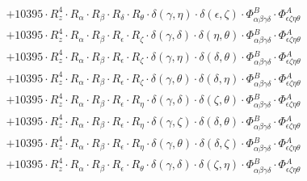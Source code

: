 \documentclass{article}
\begin{document}
\begin{equation}
\begin{array}{c}
 \\[0.2em] 		 + 10395 \cdot R_{z}^{4} \cdot R_{\alpha{}} \cdot R_{\beta{}} \cdot R_{\delta{}} \cdot R_{\theta{}} \cdot \delta{}\left(\gamma{}, \eta{}\right) \cdot \delta{}\left(\epsilon{}, \zeta{}\right) \cdot \Phi{}^{B}_{\alpha{}\beta{}\gamma{}\delta{}} \cdot \Phi{}^{A}_{\epsilon{}\zeta{}\eta{}\theta{}} 
 \\[0.2em] 		 + 10395 \cdot R_{z}^{4} \cdot R_{\alpha{}} \cdot R_{\beta{}} \cdot R_{\epsilon{}} \cdot R_{\zeta{}} \cdot \delta{}\left(\gamma{}, \delta{}\right) \cdot \delta{}\left(\eta{}, \theta{}\right) \cdot \Phi{}^{B}_{\alpha{}\beta{}\gamma{}\delta{}} \cdot \Phi{}^{A}_{\epsilon{}\zeta{}\eta{}\theta{}} 
 \\[0.2em] 		 + 10395 \cdot R_{z}^{4} \cdot R_{\alpha{}} \cdot R_{\beta{}} \cdot R_{\epsilon{}} \cdot R_{\zeta{}} \cdot \delta{}\left(\gamma{}, \eta{}\right) \cdot \delta{}\left(\delta{}, \theta{}\right) \cdot \Phi{}^{B}_{\alpha{}\beta{}\gamma{}\delta{}} \cdot \Phi{}^{A}_{\epsilon{}\zeta{}\eta{}\theta{}} 
 \\[0.2em] 		 + 10395 \cdot R_{z}^{4} \cdot R_{\alpha{}} \cdot R_{\beta{}} \cdot R_{\epsilon{}} \cdot R_{\zeta{}} \cdot \delta{}\left(\gamma{}, \theta{}\right) \cdot \delta{}\left(\delta{}, \eta{}\right) \cdot \Phi{}^{B}_{\alpha{}\beta{}\gamma{}\delta{}} \cdot \Phi{}^{A}_{\epsilon{}\zeta{}\eta{}\theta{}} 
 \\[0.2em] 		 + 10395 \cdot R_{z}^{4} \cdot R_{\alpha{}} \cdot R_{\beta{}} \cdot R_{\epsilon{}} \cdot R_{\eta{}} \cdot \delta{}\left(\gamma{}, \delta{}\right) \cdot \delta{}\left(\zeta{}, \theta{}\right) \cdot \Phi{}^{B}_{\alpha{}\beta{}\gamma{}\delta{}} \cdot \Phi{}^{A}_{\epsilon{}\zeta{}\eta{}\theta{}} 
 \\[0.2em] 		 + 10395 \cdot R_{z}^{4} \cdot R_{\alpha{}} \cdot R_{\beta{}} \cdot R_{\epsilon{}} \cdot R_{\eta{}} \cdot \delta{}\left(\gamma{}, \zeta{}\right) \cdot \delta{}\left(\delta{}, \theta{}\right) \cdot \Phi{}^{B}_{\alpha{}\beta{}\gamma{}\delta{}} \cdot \Phi{}^{A}_{\epsilon{}\zeta{}\eta{}\theta{}} 
 \\[0.2em] 		 + 10395 \cdot R_{z}^{4} \cdot R_{\alpha{}} \cdot R_{\beta{}} \cdot R_{\epsilon{}} \cdot R_{\eta{}} \cdot \delta{}\left(\gamma{}, \theta{}\right) \cdot \delta{}\left(\delta{}, \zeta{}\right) \cdot \Phi{}^{B}_{\alpha{}\beta{}\gamma{}\delta{}} \cdot \Phi{}^{A}_{\epsilon{}\zeta{}\eta{}\theta{}} 
 \\[0.2em] 		 + 10395 \cdot R_{z}^{4} \cdot R_{\alpha{}} \cdot R_{\beta{}} \cdot R_{\epsilon{}} \cdot R_{\theta{}} \cdot \delta{}\left(\gamma{}, \delta{}\right) \cdot \delta{}\left(\zeta{}, \eta{}\right) \cdot \Phi{}^{B}_{\alpha{}\beta{}\gamma{}\delta{}} \cdot \Phi{}^{A}_{\epsilon{}\zeta{}\eta{}\theta{}} 

\end{array}
\end{equation}
\end{document}

